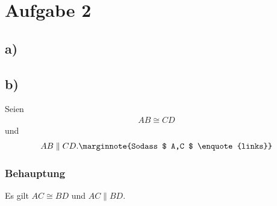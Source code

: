 \documentclass[11pt]{article}
\let\marginpar\marginnote
\begin{document}
\section*{Aufgabe 2}
\subsection*{a)}
\subsection*{b)}
Seien
\begin{equation}
\begin{aligned}
AB \cong CD \label{eq:cong}
\end{aligned}
\end{equation}
und 
\begin{equation}
\begin{aligned}
AB \parallel CD. \label{eq:parallel} \marginpar{Sodass $ A,C $ \enquote{links}}
\end{aligned}
\end{equation}
\subsubsection*{Behauptung}
Es gilt $ AC \cong BD $ und $ AC \parallel BD $.
\end{document}
